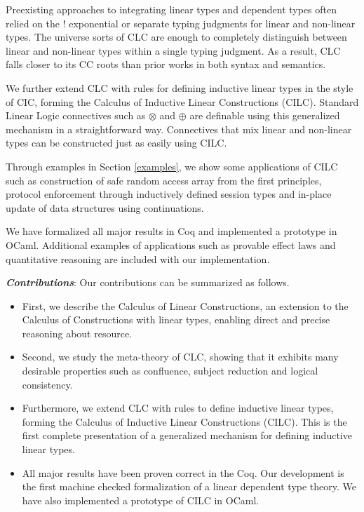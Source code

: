 \documentclass[sigplan,screen,review,anonymous]{acmart}
\begin{document}
Preexisting approaches to integrating linear types and dependent types often relied on the ! exponential or separate typing judgments for linear and non-linear types. The universe sorts of CLC are enough to completely distinguish between linear and non-linear types within a single typing judgment. As a result, CLC falls closer to its CC roots than prior works in both syntax and semantics.

We further extend CLC with rules for defining inductive linear types in the style of CIC, forming the Calculus of Inductive Linear Constructions (CILC). Standard Linear Logic connectives such as $\otimes$ and $\oplus$ are definable using this generalized mechanism in a straightforward way. Connectives that mix linear and non-linear types can be constructed just as easily using CILC.

Through examples in Section \ref{examples}, we show some applications of CILC such as construction of safe random access array from the first principles, protocol enforcement through inductively defined session types and in-place update of data structures using continuations.

We have formalized all major results in Coq and implemented a prototype in OCaml. Additional examples of applications such as provable effect laws and quantitative reasoning are included with our implementation.

\vspace{4pt}
\noindent \textbf{\textit{Contributions}}:
Our contributions can be summarized as follows.
\begin{itemize}
  \item First, we describe the Calculus of Linear Constructions, an extension to the Calculus of Constructions with linear types, enabling direct and precise reasoning about resource.
  \item Second, we study the meta-theory of CLC, showing that it exhibits many desirable properties such as confluence, subject reduction and logical consistency.
  \item Furthermore, we extend CLC with rules to define inductive linear types, forming the Calculus of Inductive Linear Constructions (CILC). This is the first complete presentation of a generalized mechanism for defining inductive linear types.
  \item All major results have been proven correct in the Coq. Our development is the first machine checked formalization of a linear dependent type theory. We have also implemented a prototype of CILC in OCaml.
\end{itemize}
\end{document}
